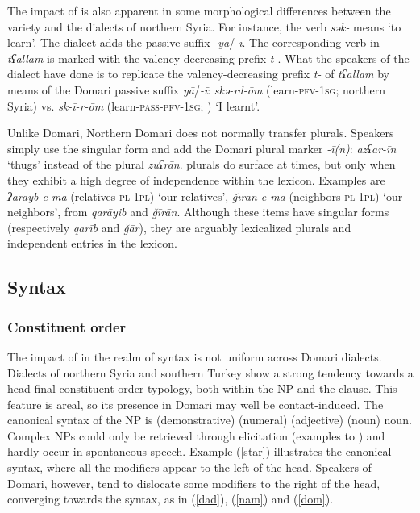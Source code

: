\documentclass[output=paper]{langsci/langscibook}
\begin{document}
The impact of  is also apparent in some morphological differences between the  variety and the dialects of northern Syria. For instance, the verb \textit{sək-} means ‘to learn’. The  dialect adds the {passive} suffix \textit{-yā}/\textit{-ī}. The corresponding verb in  \textit{tʕallam} is marked with the valency-decreasing prefix \textit{t-}. What the speakers of the  dialect have done is to replicate the valency-decreasing prefix \textit{t-} of \textit{tʕallam} by means of the Domari {passive} suffix  \textit{yā}/\textit{{}-ī}: \textit{skə-rd-ōm} (learn-\textsc{pfv-1sg}; northern Syria) vs. \textit{sk-ī-r-ōm} (learn-\textsc{pass-pfv-1sg}; ) ‘I learnt’.

Unlike  Domari, Northern Domari does not normally {transfer}  plurals. Speakers simply use the singular form and add the Domari plural marker \textit{-ī(n)}:  \textit{azʕar-īn} ‘thugs’ instead of the  plural \textit{zuʕrān}.  plurals do surface at times, but only when they exhibit a high degree of independence within the lexicon. Examples are \textit{ʔarāyb-ē-mā} (relatives-\textsc{pl-1pl}) ‘our relatives’, \textit{\v{g}īrān-ē-mā} (neighbors-\textsc{pl-1pl}) ‘our neighbors’, from  \textit{qarāyib} and \textit{\v{g}īrān}. Although these items have singular forms (respectively \textit{qarīb} and \textit{\v{g}ār}), they are arguably lexicalized plurals and independent entries in the  lexicon.


 
 \subsection{Syntax}
 \subsubsection{Constituent order}

The impact of  in the realm of syntax is not uniform across Domari dialects. Dialects of northern Syria and southern Turkey show a strong tendency towards a head-final constituent-order typology, both within the NP and the clause. This feature is areal, so its presence in Domari may well be contact-induced. The canonical syntax of the NP is (demonstrative) (numeral) (adjective) (noun) noun. Complex NPs could only be retrieved through elicitation (examples  to ) and hardly occur in spontaneous speech. Example (\ref{star}) illustrates the canonical syntax, where all the modifiers appear to the left of the head. Speakers of  Domari, however, tend to dislocate some modifiers to the right of the head, converging towards the  syntax, as in (\ref{dad}), (\ref{nam}) and (\ref{dom}).
\end{document}
